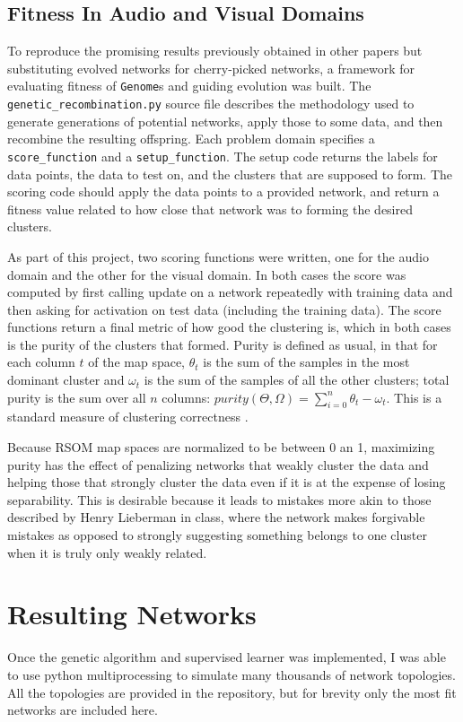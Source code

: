 \documentclass[12pt,a4paper]{article}
\begin{document}
\subsection{Fitness In Audio and Visual Domains}
To reproduce the promising results previously obtained in other papers but substituting evolved networks for cherry-picked networks, a framework for evaluating fitness of \texttt{Genome}s and guiding evolution was built.  The \texttt{genetic\_recombination.py} source file describes the methodology used to generate generations of potential networks, apply those to some data, and then recombine the resulting offspring.  Each problem domain specifies a \texttt{score\_function} and a \texttt{setup\_function}.  The setup code returns the labels for data points, the data to test on, and the clusters that are supposed to form.  The scoring code should apply the data points to a provided network, and return a fitness value related to how close that network was to forming the desired clusters.

As part of this project, two scoring functions were written, one for the audio domain and the other for the visual domain.  In both cases the score was computed by first calling update on a network repeatedly with training data and then asking for activation on test data (including the training data).  The score functions return a final metric of how good the clustering is, which in both cases is the purity of the clusters that formed.  Purity is defined as usual, in that for each column $t$ of the map space, $\theta_t$ is the sum of the samples in the most dominant cluster and $\omega_t$ is the sum of the samples of all the other clusters; total purity is the sum over all $n$ columns: $purity(\Theta, \Omega) = \sum_{i=0}^n{\theta_t - \omega_t}$.  This is a standard measure of clustering correctness \cite{Purity}.

Because RSOM map spaces are normalized to be between 0 an 1, maximizing purity has the effect of penalizing networks that weakly cluster the data and helping those that strongly cluster the data even if it is at the expense of losing separability.  This is desirable because it leads to mistakes more akin to those described by Henry Lieberman in class, where the network makes forgivable mistakes as opposed to strongly suggesting something belongs to one cluster when it is truly only weakly related.

\section{Resulting Networks}
Once the genetic algorithm and supervised learner was implemented, I was able to use python multiprocessing to simulate many thousands of network topologies.  All the topologies are provided in the repository, but for brevity only the most fit networks are included here.
\end{document}
